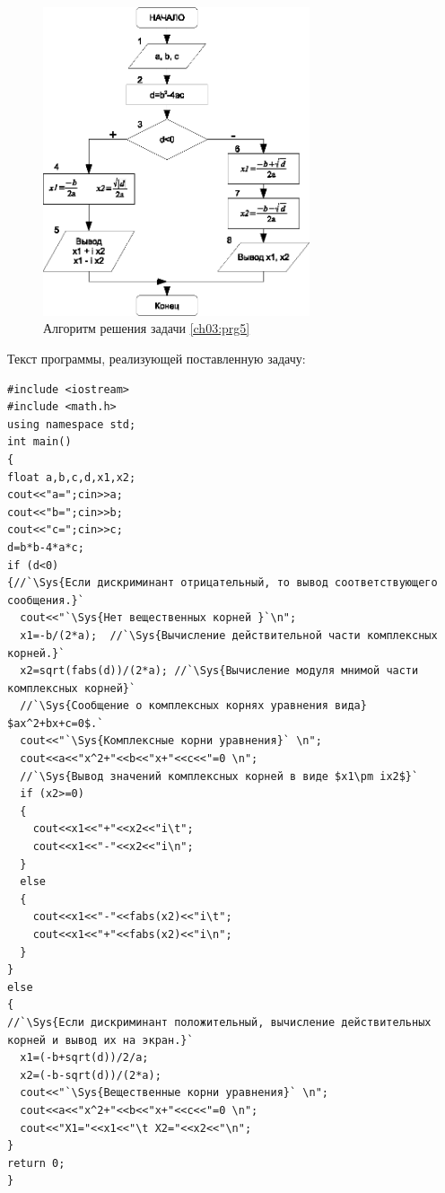 \begin{figure}[htb]
\begin{center}
\includegraphics[width=0.7\textwidth]{img/ris_3_16}
\caption{Алгоритм решения задачи \ref{ch03:prg5}}
\label{ch03:refDrawing15}
\end{center}
\end{figure}

Текст программы, реализующей поставленную задачу:
\begin{lstlisting}
#include <iostream>
#include <math.h>
using namespace std;
int main()
{
float a,b,c,d,x1,x2;
cout<<"a=";cin>>a;
cout<<"b=";cin>>b;
cout<<"c=";cin>>c;
d=b*b-4*a*c;
if (d<0)
{//`\Sys{Если дискриминант отрицательный, то вывод соответствующего сообщения.}`
  cout<<"`\Sys{Нет вещественных корней }`\n";
  x1=-b/(2*a);  //`\Sys{Вычисление действительной части комплексных корней.}`
  x2=sqrt(fabs(d))/(2*a); //`\Sys{Вычисление модуля мнимой части комплексных корней}`
  //`\Sys{Сообщение о комплексных корнях уравнения вида} $ax^2+bx+c=0$.`
  cout<<"`\Sys{Комплексные корни уравнения}` \n";
  cout<<a<<"x^2+"<<b<<"x+"<<c<<"=0 \n";
  //`\Sys{Вывод значений комплексных корней в виде $x1\pm ix2$}`
  if (x2>=0)
  {
    cout<<x1<<"+"<<x2<<"i\t";
    cout<<x1<<"-"<<x2<<"i\n";
  }
  else
  {
    cout<<x1<<"-"<<fabs(x2)<<"i\t";
    cout<<x1<<"+"<<fabs(x2)<<"i\n";
  }
}
else
{
//`\Sys{Если дискриминант положительный, вычисление действительных корней и вывод их на экран.}`
  x1=(-b+sqrt(d))/2/a;
  x2=(-b-sqrt(d))/(2*a);
  cout<<"`\Sys{Вещественные корни уравнения}` \n";
  cout<<a<<"x^2+"<<b<<"x+"<<c<<"=0 \n";
  cout<<"X1="<<x1<<"\t X2="<<x2<<"\n";
}
return 0;
}
\end{lstlisting}

